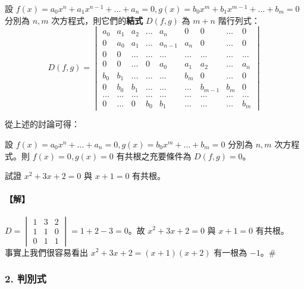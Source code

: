 \begin{definition}\label{def:b6s-app3-resultant}
設 $f(x) = a_0 x^n + a_1 x^{n-1} + \dots + a_n = 0, g(x) = b_0 x^m + b_1 x^{m-1} + \dots + b_m = 0$ 分別為 $n, m$ 次方程式，則它們的\textbf{結式} $D(f, g)$ 為 $m+n$ 階行列式：
\[ D(f, g) = \begin{vmatrix}
a_0 & a_1 & a_2 & \dots & a_n & 0 & 0 & \dots & 0 \\
0 & a_0 & a_1 & \dots & a_{n-1} & a_n & 0 & \dots & 0 \\
0 & 0 & \dots & \dots & \dots & \dots & \dots & \dots & \dots \\
0 & 0 & \dots & 0 & a_0 & a_1 & a_2 & \dots & a_n \\
b_0 & b_1 & \dots & \dots & \dots & b_m & 0 & \dots & 0 \\
0 & b_0 & b_1 & \dots & \dots & \dots & b_{m-1} & b_m & 0 \\
\dots & \dots & \dots & \dots & \dots & \dots & \dots & \dots & \dots \\
0 & \dots & 0 & b_0 & b_1 & \dots & \dots & \dots & b_m
\end{vmatrix} \]
\end{definition}

從上述的討論可得：

\begin{theorem}\label{thm:b6s-app3-resultant-roots}
設 $f(x) = a_0 x^n + \dots + a_n = 0, g(x) = b_0 x^m + \dots + b_m = 0$ 分別為 $n, m$ 次方程式。則 $f(x)=0, g(x)=0$ 有共根之充要條件為 $D(f, g) = 0$。
\end{theorem}

\begin{example}\label{ex:b6s-app3-1}
試證 $x^2+3x+2=0$ 與 $x+1=0$ 有共根。
\end{example}

\paragraph{【解】}
$D = \begin{vmatrix} 1 & 3 & 2 \\ 1 & 1 & 0 \\ 0 & 1 & 1 \end{vmatrix} = 1 + 2 - 3 = 0$。故 $x^2+3x+2=0$ 與 $x+1=0$ 有共根。\\
事實上我們很容易看出 $x^2+3x+2 = (x+1)(x+2)$ 有一根為 $-1$。\hfill$\#$

\subsubsection*{2. 判別式}\label{subsec:b6s-app3-2}

